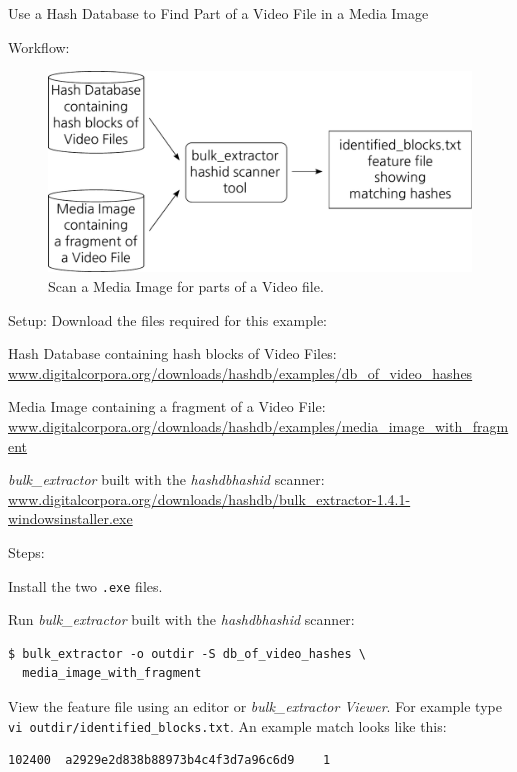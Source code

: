 \documentclass[12pt,twoside]{article}
\newcommand{\hdb}{\emph{hashdb}\xspace}
\newcommand{\bulk}{\emph{bulk\_extractor}\xspace}
\newcommand{\bev}{\emph{bulk\_extractor Viewer}\xspace}
\begin{document}
\large Use a Hash Database to Find Part of a Video File in a Media Image
\normalsize


Workflow:
\begin{figure}[h]
  \center
  \includegraphics[scale=0.5]{drawings/scan_hashid}
  \caption*{Scan a Media Image for parts of a Video file.}
  \label{fig:scan_hashid}
\end{figure}

Setup: Download the files required for this example:
\begin{compactitem}
\item Hash Database containing hash blocks of Video Files:
\url{www.digitalcorpora.org/downloads/hashdb/examples/db\_of\_video\_hashes}
\item Media Image containing a fragment of a Video File:
\url{www.digitalcorpora.org/downloads/hashdb/examples/media\_image\_with\_fragment}
\item \bulk built with the \hdb \emph{hashid} scanner:
\url{www.digitalcorpora.org/downloads/hashdb/bulk\_extractor-1.4.1-windowsinstaller.exe}
\end{compactitem}

Steps:
\begin{compactenum}
\item Install the two \texttt{.exe} files.
\item Run \bulk built with the \hdb \emph{hashid} scanner:
\begin{verbatim}
$ bulk_extractor -o outdir -S db_of_video_hashes \
  media_image_with_fragment
\end{verbatim}
\item View the feature file using an editor or \bev.
For example type \texttt{vi outdir/identified\_blocks.txt}.
An example match looks like this:
\begin{verbatim}
102400	a2929e2d838b88973b4c4f3d7a96c6d9	1
\end{verbatim}
\end{compactenum}
\end{document}
